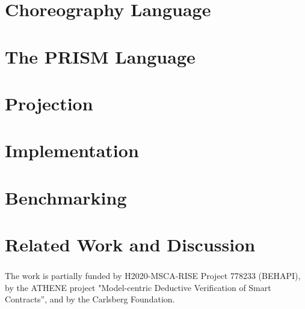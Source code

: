 \documentclass[runningheads]{llncs}
\begin{document}
\section{Choreography Language}\label{sec:chor}


\section{The PRISM Language}\label{sec:prism}


\section{Projection}\label{sec:proj}


\section{Implementation}

\section{Benchmarking}


\section{Related Work and Discussion}


\begin{credits}
  \subsubsection{\ackname} The work is partially funded by
  H2020-MSCA-RISE Project 778233 (BEHAPI), by the ATHENE project
  "Model-centric Deductive Verification of Smart Contracts”, and by
  the Carlsberg Foundation.
\end{credits}


\newpage




% 
\end{document}
